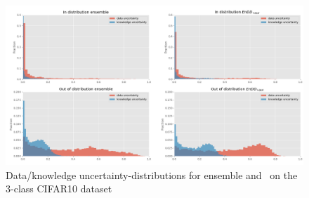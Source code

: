 \begin{figure}[h!]
    \centering
    \includegraphics[width = \linewidth]{../openreview/plots/uncertainty_hist_3class.PNG}
    \caption{Data/knowledge uncertainty-distributions for ensemble and \EnDDaux \ on the 3-class CIFAR10 dataset}
    \label{fig:3-class_uncertainty_hist}
\end{figure}



